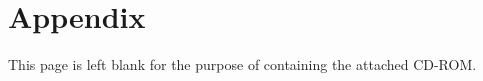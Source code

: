\clearpage{\thispagestyle{empty}\cleardoublepage}

\part{Appendix}
\clearpage{\thispagestyle{empty}\cleardoublepage}




\label{bib}

\cleardoublepage
\thispagestyle{empty}
\vspace*{4cm}
\label{cd}
{\centering This page is left blank for the purpose of containing the attached CD-ROM.}

